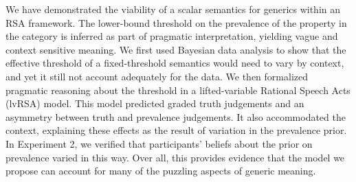 \documentclass[10pt,letterpaper]{article}
\begin{document}
We have demonstrated the viability of a scalar semantics for generics within an RSA framework. The lower-bound threshold on the prevalence of the property in the category is inferred as part of pragmatic interpretation, yielding vague and context sensitive meaning. We first used Bayesian data analysis to show that the effective threshold of a fixed-threshold semantics would need to vary by context, and yet it still not account adequately for the data. We then formalized pragmatic reasoning about the threshold in a lifted-variable Rational Speech Acts (lvRSA) model. This model predicted graded truth judgements and an asymmetry between truth and prevalence judgements. It also accommodated the context, explaining these effects as the result of variation in the prevalence prior. In Experiment 2, we verified that participants' beliefs about the prior on prevalence varied in this way. Over all, this provides evidence that the model we propose can account for many of the puzzling aspects of generic meaning.

%

%
 
\end{document}
